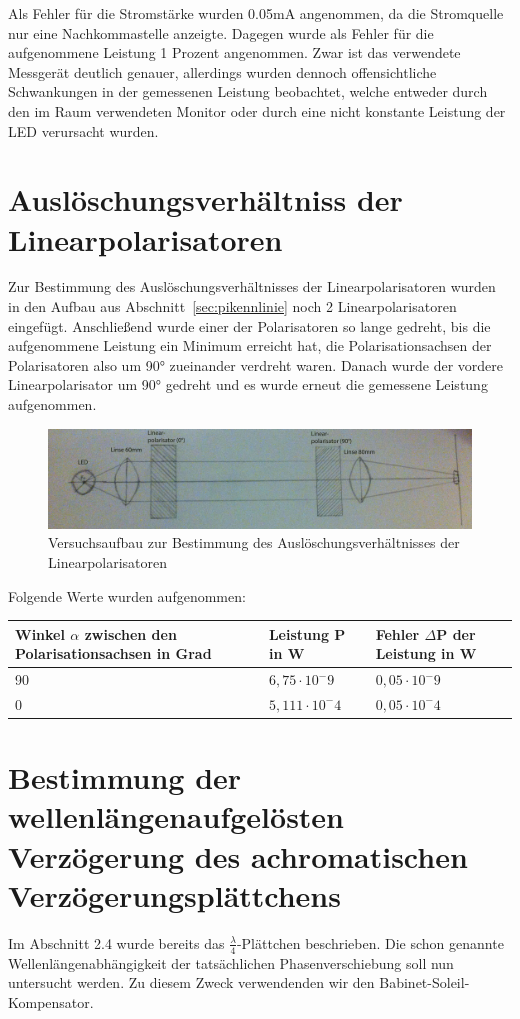 \documentclass[bigchapter,colorback,accentcolor=tud4b,linedtoc,11pt]{tudreport}
\begin{document}
Als Fehler für die Stromstärke wurden 0.05mA angenommen, da die Stromquelle nur eine Nachkommastelle anzeigte. Dagegen wurde als Fehler für die aufgenommene Leistung 1 Prozent angenommen. Zwar ist das verwendete Messgerät deutlich genauer, allerdings wurden dennoch offensichtliche Schwankungen in der gemessenen Leistung beobachtet, welche entweder durch den im Raum verwendeten Monitor oder durch eine nicht konstante Leistung der LED verursacht wurden.

\section{Auslöschungsverhältniss der Linearpolarisatoren}
Zur Bestimmung des Auslöschungsverhältnisses der Linearpolarisatoren wurden in den Aufbau aus Abschnitt~\ref{sec:pikennlinie} noch 2 Linearpolarisatoren eingefügt.
Anschließend wurde einer der Polarisatoren so lange gedreht, bis die aufgenommene Leistung ein Minimum erreicht hat, die Polarisationsachsen der Polarisatoren also um 90° zueinander verdreht waren. Danach wurde der vordere Linearpolarisator um 90° gedreht und es wurde erneut die gemessene Leistung aufgenommen.

\begin{figure}[ht!]
\centering
\includegraphics[width=150mm]{img/skizzen/versuch_b.jpg}
\caption{Versuchsaufbau zur Bestimmung des Auslöschungsverhältnisses der Linearpolarisatoren}
\label{Auslöschungsverhältniss-Linearpolarisatoren}
\end{figure}
Folgende Werte wurden aufgenommen:
\begin{center}
  \begin{tabular}{|p{5cm}|p{4cm}|p{4.5cm}|}
    \hline
        Winkel $\alpha$ zwischen den Polarisationsachsen in Grad & Leistung P in W & Fehler $\Delta$P der Leistung in W \\ \hline
        90 & $6,75 \cdot 10^-9$ & $0,05 \cdot 10^-9$ \\ \hline
        0 & $5,111 \cdot 10^-4$ & $0,05 \cdot 10^-4$ \\ \hline
	\end{tabular}
\end{center}
\section{Bestimmung der wellenlängenaufgelösten Verzögerung des achromatischen Verzögerungsplättchens}
Im Abschnitt 2.4 wurde bereits das $\frac{\lambda}{4}$-Plättchen beschrieben. Die schon genannte Wellenlängenabhängigkeit der tatsächlichen Phasenverschiebung soll nun untersucht werden. Zu diesem Zweck verwendenden wir den Babinet-Soleil-Kompensator. 
\end{document}
